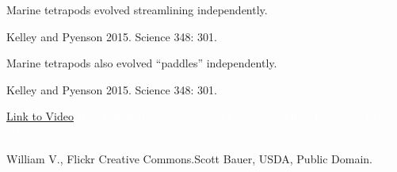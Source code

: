 \documentclass[t,handout]{beamer}  %
\begin{document}
%
{
\begin{frame}[b]{Marine tetrapods evolved streamlining independently.}

	\hfill \tiny Kelley and Pyenson 2015. Science 348: 301.

\end{frame}
}
%
{
\begin{frame}[b]{Marine tetrapods also evolved “paddles” independently.}

	\hfill {}

\end{frame}
}
%
{
\begin{frame}[b]

	\hfill \tiny Kelley and Pyenson 2015. Science 348: 301.

\end{frame}
}
%
{
\begin{frame}[b]
\end{frame}
}
%
{
\begin{frame}[b]

\end{frame}
}
%
{
\begin{frame}[b]

	\tiny\textcolor{white}{\href{https://www.youtube.com/watch?v=OL7O5O7U4Gs}{Link to Video}
	\hfill
	Based on Waters et al. 2012. Modeling huddling penguins. PLoS ONE 7: e50277.}

\end{frame}
}
%
{
\begin{frame}[b]

	\tiny William V., Flickr Creative Commons.\hfill Scott Bauer, USDA, Public Domain.

\end{frame}
}
\end{document}
